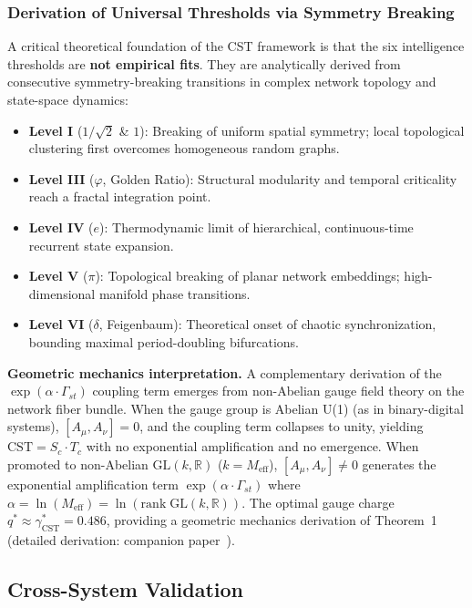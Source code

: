 \documentclass[12pt]{article}
\newcommand{\CST}{\mathrm{CST}}
\newcommand{\Sc}{S_c}
\newcommand{\Tc}{T_c}
\newcommand{\Gst}{\Gamma_{st}}
\newcommand{\Meff}{M_{\mathrm{eff}}}
\begin{document}
\subsubsection{Derivation of Universal Thresholds via Symmetry Breaking}

A critical theoretical foundation of the CST framework is that the six intelligence thresholds are \textbf{not empirical fits}. They are analytically derived from consecutive symmetry-breaking transitions in complex network topology and state-space dynamics:

\begin{itemize}
\item \textbf{Level I} ($1/\sqrt{2}$ \& $1$): Breaking of uniform spatial symmetry; local topological clustering first overcomes homogeneous random graphs.
\item \textbf{Level III} ($\varphi$, Golden Ratio): Structural modularity and temporal criticality reach a fractal integration point.
\item \textbf{Level IV} ($e$): Thermodynamic limit of hierarchical, continuous-time recurrent state expansion.
\item \textbf{Level V} ($\pi$): Topological breaking of planar network embeddings; high-dimensional manifold phase transitions.
\item \textbf{Level VI} ($\delta$, Feigenbaum): Theoretical onset of chaotic synchronization, bounding maximal period-doubling bifurcations.
\end{itemize}

\textbf{Geometric mechanics interpretation.} A complementary derivation of the $\exp(\alpha \cdot \Gst)$ coupling term emerges from non-Abelian gauge field theory on the network fiber bundle. When the gauge group is Abelian U(1) (as in binary-digital systems), $[A_\mu, A_\nu] = 0$, and the coupling term collapses to unity, yielding $\CST = \Sc \cdot \Tc$ with no exponential amplification and no emergence. When promoted to non-Abelian $\mathrm{GL}(k,\mathbb{R})$ ($k = \Meff$), $[A_\mu, A_\nu] \neq 0$ generates the exponential amplification term $\exp(\alpha \cdot \Gst)$ where $\alpha = \ln(\Meff) = \ln(\mathrm{rank}\;\mathrm{GL}(k,\mathbb{R}))$. The optimal gauge charge $q^* \approx \gamma^*_{\mathrm{CST}} = 0.486$, providing a geometric mechanics derivation of Theorem~1 (detailed derivation: companion paper~\cite{liu2026companion}).

\subsection{Cross-System Validation}
\end{document}
